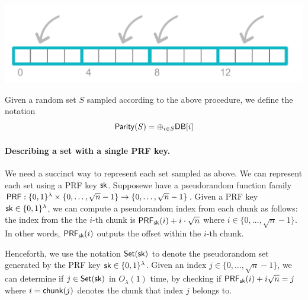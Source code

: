\begin{center}
    \includegraphics[scale=0.6]{piano-sample}
\end{center}

Given a random set $S$ sampled according to the above procedure,
we define the notation
\[
{\sf Parity}(S) = \oplus_{i \in S}{\sf DB}[i] 
\] 


\paragraph{Describing a set with a single PRF key.}
We need a succinct way to represent each set sampled as above.
We can represent each 
set using a PRF key ${\sf sk}$.
Supposewe have a 
pseudorandom function family 
${\sf PRF}:\{0,1\}^\lambda\times \{0,\dots,\sqrt{n}-1\}\to \{0,\dots,\sqrt{n}-1\}$. 
Given a PRF key ${\sf sk} \in \{0, 1\}^\lambda$, 
we can compute a pseudorandom 
index from each chunk as follows:
the index from the 
the $i$-th chunk is ${\sf PRF}_{\sf sk}(i)+i\cdot\sqrt{n}$ where $i \in \{0, \ldots, \sqrt{n}-1\}$. 
In other words,
${\sf PRF}_{\sf sk}(i)$ outputs the offset within the 
$i$-th chunk.

%

Henceforth, we use the notation ${\sf Set}({\sf sk})$ to denote
the pseudorandom set generated by the PRF key ${\sf sk} \in \{0, 1\}^\lambda$.
Given an index $j \in \{0,\dots,\sqrt{n}-1\}$,
we can determine if 
$j \in {\sf Set}({\sf sk})$ in $O_\lambda(1)$ time, 
by checking 
if ${\sf PRF}_{\sf sk}(i) + i \sqrt{n} = j$ where $i = {\sf chunk}(j)$ denotes
the chunk that index $j$ belongs to.



